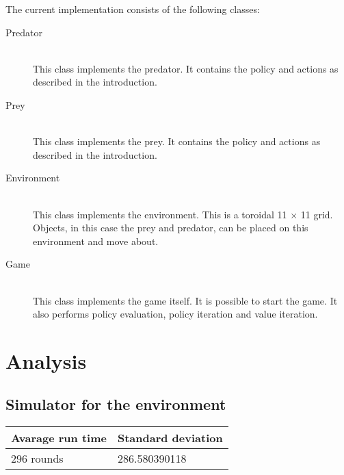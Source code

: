 \documentclass{article}
\begin{document}
\noindent The current implementation consists of the following classes:
\begin{description}
	\item[Predator] \hfill \\ 
	This class implements the predator. It contains the policy and actions as described in the introduction.
	
	\item[Prey] \hfill \\ 
	This class implements the prey. It contains the policy and actions as described in the introduction.
	
	\item[Environment] \hfill \\ 
	This class implements the environment. This is a toroidal 11 $\times$ 11 grid. Objects, in this case the prey and predator, can be placed on this environment and move about.
	
	\item[Game] \hfill \\ 
	This class implements the game itself. It is possible to start the game. It also performs policy evaluation, policy iteration and value iteration.
	
\end{description}


\section*{Analysis}


\subsection*{Simulator for the environment}


\begin{center}
	\begin{tabular}{  l ||  l }
		Avarage run time & Standard deviation \\ 
		\hline
		296 rounds &  286.580390118 %
	\end{tabular}
\end{center}
\end{document}
